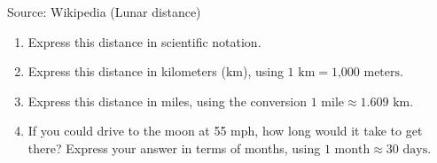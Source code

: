 \begin{enumerate}
\hfill \begin{footnotesize} Source:  Wikipedia (Lunar distance)\end{footnotesize}
\begin{enumerate}
\item Express this distance in scientific notation. \vfill
\item Express this distance in kilometers (km), using $1 \text{ km} = \text{1,000 meters}$. \vfill \vfill
\item Express this distance in miles, using the conversion $1 \text{ mile} \approx 1.609 \text{ km}$. \vfill \vfill
\item If you could drive to the moon at 55 mph, how long would it take to get there? Express your answer in terms of months, using $1 \text{ month} \approx 30 \text{ days}$. \vfill \vfill \vfill
\end{enumerate}


\end{enumerate}

